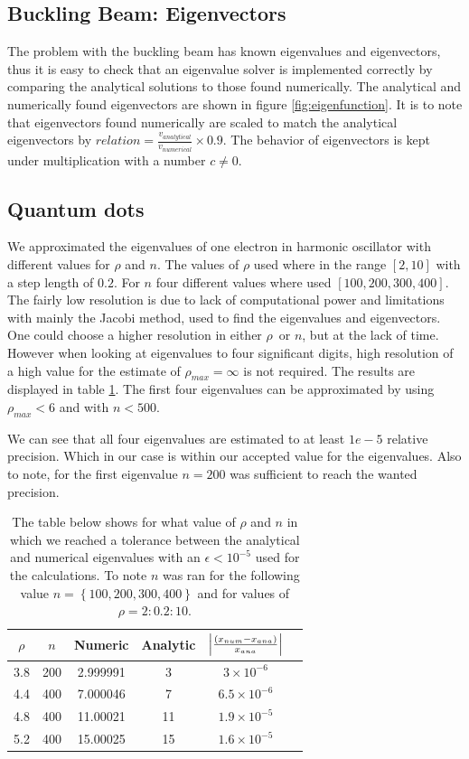\documentclass[%
reprint,
nofootinbib,
amsmath,amssymb,
aps,
]{revtex4-1}
\begin{document}
\subsection{Buckling Beam: Eigenvectors}%
The problem with the buckling beam has known eigenvalues and eigenvectors, thus it is easy to check that an eigenvalue solver is implemented correctly  by comparing the analytical solutions to those found numerically. The analytical and numerically found eigenvectors are shown in figure \ref{fig:eigenfunction}. It is to note that eigenvectors found numerically are scaled to match the analytical eigenvectors by $relation = \frac{v_{analytical}}{v_{numerical}}\times 0.9$. The behavior of eigenvectors is kept under multiplication with a number $c \neq 0$. 

\subsection{Quantum dots}%
We approximated the eigenvalues of one electron in harmonic oscillator with different values for $\rho$ and $n$. The values of $\rho$ used where in the range $[2,10]$ with a step length of $0.2$. For $n$ four different values where used $[100,200,300,400]$. The fairly low resolution is due to lack of computational power and limitations with mainly the Jacobi method, used to find the eigenvalues and eigenvectors. One could choose a higher resolution in either $\rho$ or $n$, but at the lack of time. However when looking at eigenvalues to four significant digits, high resolution of a high value for the estimate of $\rho_{max} = \infty$ is not required. The results are displayed in table \ref{table}. The first four eigenvalues can be approximated by using $\rho_{max} < 6$ and with $n < 500$. 

We can see that all four eigenvalues are estimated to at least $1e-5$ relative precision. Which in our case is within our accepted value for the eigenvalues. Also to note, for the first eigenvalue $n = 200$ was sufficient to reach the wanted precision. 

\begin{table}
	\caption{The table below shows for what value of $\rho$ and $n$ in which we reached a tolerance between the analytical and numerical eigenvalues with an $\epsilon < 10^{-5}$ used for the calculations. To note $n$ was ran for the following value $n=\left\lbrace100, 200, 300, 400\right\rbrace$ and for values of $\rho = 2:0.2:10$.}
	\begin{tabular}{ c|c|c|c|c|c}\label{table}
		$\rho$ & $n$ & Numeric & Analytic & $\abs{\frac{(x_{num} - x_{ana})}{x_{ana}}}$\\ \hline
		3.8 & 200 & 2.999991 & 3 & $3\times 10^{-6}$ \\  
		4.4 & 400 & 7.000046 & 7 & $6.5 \times 10^{-6}$ \\
		4.8 & 400 & 11.00021 & 11 & $1.9 \times 10^{-5}$ \\
		5.2 & 400 & 15.00025 & 15 & $1.6 \times 10^{-5}$
	\end{tabular}
\end{table}
\end{document}
